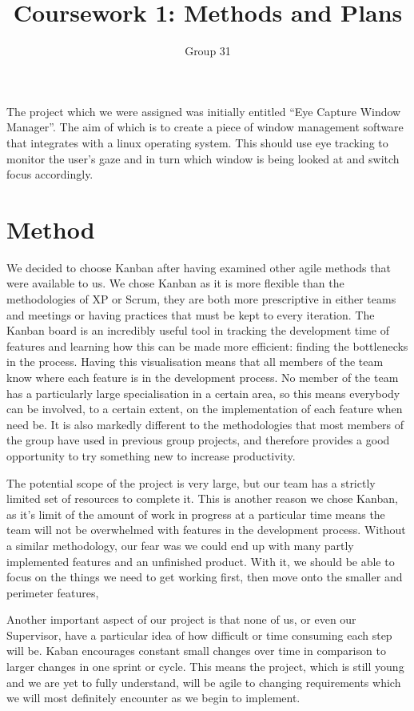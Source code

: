 \documentclass{article}
\title{Coursework 1: Methods and Plans}
\author{Group 31}
\begin{document}
\maketitle
The project which we were assigned was initially entitled “Eye Capture Window Manager”.  The aim of which is to create a piece of window management software that integrates with a linux operating system.  This should use eye tracking to monitor the user’s gaze and in turn which window is being looked at and switch focus accordingly.
\section*{Method}
We decided to choose Kanban after having examined other agile methods that were available to us.  We chose Kanban as it is more flexible than the methodologies of XP or Scrum, they are both more prescriptive in either teams and meetings or having practices that must be kept to every iteration.  The Kanban board is an incredibly useful tool in tracking the development time of features and learning how this can be made more efficient: finding the bottlenecks in the process.  Having this visualisation means that all members of the team know where each feature is in the development process.  No member of the team has a particularly large specialisation in a certain area, so this means everybody can be involved, to a certain extent, on the implementation of each feature when need be. It is also markedly different to the methodologies that most members of the group have used in previous group projects, and therefore provides a good opportunity to try something new to increase productivity.

The potential scope of the project is very large, but our team has a strictly limited set of resources to complete it.  This is another reason we chose Kanban, as it’s limit of the amount of work in progress at a particular time means the team will not be overwhelmed with features in the development process.   Without a similar methodology, our fear was we could end up with many partly implemented features and an unfinished product. With it, we should be able to focus on the things we need to get working first, then move onto the smaller and perimeter features,

Another important aspect of our project is that none of us, or even our Supervisor, have a particular idea of how difficult or time consuming each step will be. Kaban encourages constant small changes over time in comparison to larger changes in one sprint or cycle.  This means the project, which is still young and we are yet to fully understand, will be agile to changing requirements which we will most definitely encounter as we begin to implement.
\end{document}
